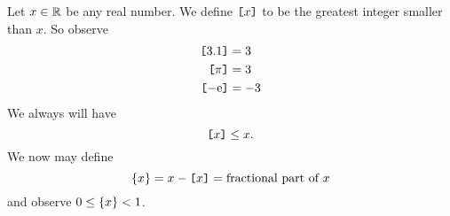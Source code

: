 Let $x\in\RR$ be any real number. We define $\intPart{x}$ to be the
greatest integer smaller than $x$. So observe
\begin{subequations}
\begin{align}
\intPart{3.1} &= 3\\
\intPart{\pi} &= 3\\
\intPart{-\E} &=-3
\end{align}
\end{subequations}
We always will have
\begin{equation}
\intPart{x}\leq x.
\end{equation}
We now may define
\begin{equation}
\fracPart{x}=x-\intPart{x}=\mbox{fractional part of $x$}
\end{equation}
and observe $0\leq\fracPart{x}<1$.

